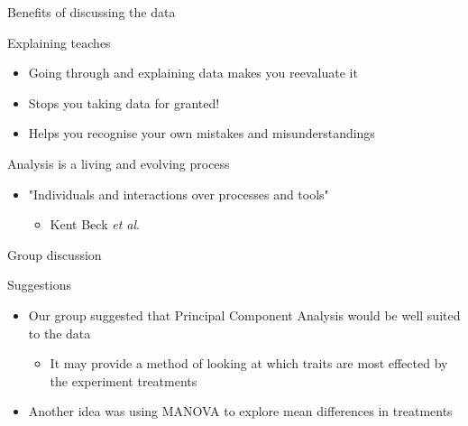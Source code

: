 \documentclass[t, aspectratio=169]{beamer}
\begin{document}
\begin{frame}[label={sec:org357258b}]{Benefits of discussing the data}
\begin{block}{Explaining teaches}
\begin{itemize}
\item Going through and explaining data makes you reevaluate it
\item Stops you taking data for granted!
\item Helps you recognise your own mistakes and misunderstandings
\end{itemize}
\end{block}


\begin{block}{Analysis is a living and evolving process}
\begin{itemize}
\item "Individuals and interactions over processes and tools"
\begin{itemize}
\item Kent Beck \emph{et al}.
\end{itemize}
\end{itemize}
\end{block}
\end{frame}
\begin{frame}[label={sec:org09c4108}]{Group discussion}
\begin{block}{Suggestions}
\begin{itemize}
\item Our group suggested that Principal Component Analysis would be well suited to the data
\begin{itemize}
\item It may provide a method of looking at which traits are most effected by the experiment treatments
\end{itemize}
\item Another idea was using MANOVA to explore mean differences in treatments
\end{itemize}
\end{block}
\end{frame}
\end{document}
